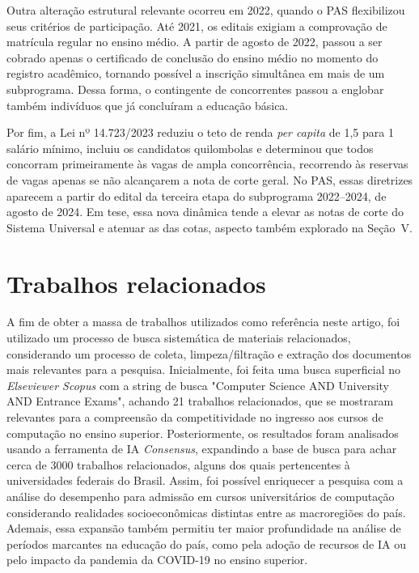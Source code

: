 \documentclass[12pt]{article}
\begin{document}
Outra alteração estrutural relevante ocorreu em 2022, quando o PAS flexibilizou seus critérios de participação. Até 2021, os editais exigiam a comprovação de matrícula regular no ensino médio. A partir de agosto de 2022, passou a ser cobrado apenas o certificado de conclusão do ensino médio no momento do registro acadêmico, tornando possível a inscrição simultânea em mais de um subprograma. Dessa forma, o contingente de concorrentes passou a englobar também indivíduos que já concluíram a educação básica.

Por fim, a Lei nº 14.723/2023 reduziu o teto de renda \textit{per capita} de 1,5 para 1 salário mínimo, incluiu os candidatos quilombolas e determinou que todos concorram primeiramente às vagas de ampla concorrência, recorrendo às reservas de vagas apenas se não alcançarem a nota de corte geral. No PAS, essas diretrizes aparecem a partir do edital da terceira etapa do subprograma 2022--2024, de agosto de 2024. Em tese, essa nova dinâmica tende a elevar as notas de corte do Sistema Universal e atenuar as das cotas, aspecto também explorado na Seção~V.

\section{Trabalhos relacionados}
A fim de obter a massa de trabalhos utilizados como referência neste artigo, foi utilizado um processo de busca sistemática de materiais relacionados, considerando um processo de coleta, limpeza/filtração e extração dos documentos mais relevantes para a pesquisa. Inicialmente, foi feita uma busca superficial no \textit{Elseviewer Scopus} com a string de busca "Computer Science AND University AND Entrance Exams", achando 21 trabalhos relacionados, que se mostraram relevantes para a compreensão da competitividade no ingresso aos cursos de computação no ensino superior. Posteriormente, os resultados foram analisados usando a ferramenta de IA \textit{Consensus}, expandindo a base de busca para achar cerca de 3000 trabalhos relacionados, alguns dos quais pertencentes à universidades federais do Brasil. Assim, foi possível enriquecer a pesquisa com a análise do desempenho para admissão em cursos universitários de computação considerando realidades socioeconômicas distintas entre as macroregiões do país. Ademais, essa expansão também permitiu ter maior profundidade na análise de períodos marcantes na educação do país, como pela adoção de recursos de IA ou pelo impacto da pandemia da COVID-19 no ensino superior.
\end{document}
